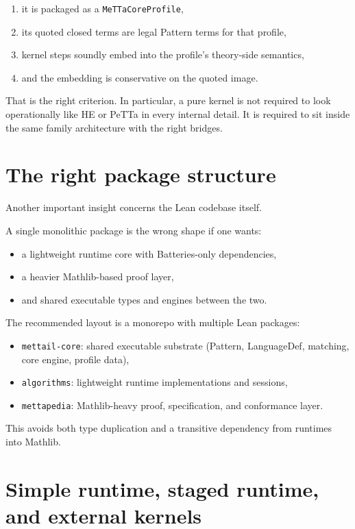 \documentclass[11pt]{article}
\begin{document}
\begin{enumerate}
  \item it is packaged as a \texttt{MeTTaCoreProfile},
  \item its quoted closed terms are legal Pattern terms for that profile,
  \item kernel steps soundly embed into the profile's theory-side semantics,
  \item and the embedding is conservative on the quoted image.
\end{enumerate}

That is the right criterion. In particular, a pure kernel is not required to look operationally like HE or PeTTa in every internal detail. It is required to sit inside the same family architecture with the right bridges.

\section{The right package structure}

Another important insight concerns the Lean codebase itself.

A single monolithic package is the wrong shape if one wants:

\begin{itemize}
  \item a lightweight runtime core with Batteries-only dependencies,
  \item a heavier Mathlib-based proof layer,
  \item and shared executable types and engines between the two.
\end{itemize}

The recommended layout is a monorepo with multiple Lean packages:

\begin{itemize}
  \item \texttt{mettail-core}: shared executable substrate (Pattern, LanguageDef, matching, core engine, profile data),
  \item \texttt{algorithms}: lightweight runtime implementations and sessions,
  \item \texttt{mettapedia}: Mathlib-heavy proof, specification, and conformance layer.
\end{itemize}

This avoids both type duplication and a transitive dependency from runtimes into Mathlib.

\section{Simple runtime, staged runtime, and external kernels}
\end{document}
